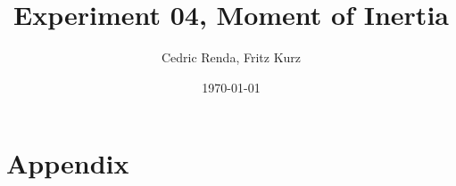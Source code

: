 \documentclass[12pt,a4paper]{article}
\title{Experiment 04, Moment of Inertia}
\author{Cedric Renda, Fritz Kurz}
\date{\today }
\begin{document}
\maketitle




\tableofcontents







\newpage

\section{Appendix}

\end{document}

